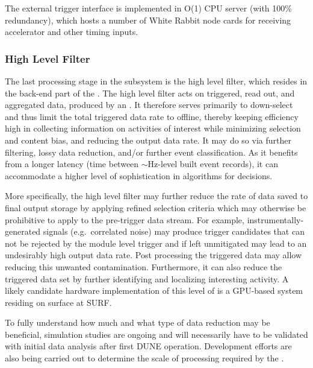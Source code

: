 The external trigger interface is implemented in O(1) CPU server (with 100\%
redundancy), which hosts a number of White Rabbit node cards for
receiving accelerator and other timing inputs.

\subsubsection{High Level Filter}
\label{sec:fd-daq:design-data-reduction}

The last processing stage in the  subsystem is the
high level filter, which resides in the back-end part of the .
The high level filter acts on triggered, read out, and aggregated data,
produced by an . 
It therefore serves primarily to down-select and thus
limit the total triggered data rate to offline, thereby keeping %
efficiency high in collecting information on activities of interest
while minimizing selection and content bias, and reducing the output data
rate. It may do so via 
further filtering, lossy data reduction, and/or further event
classification. As it benefits from a longer latency (time between
$\sim$Hz-level built event records), it can accommodate a higher level of
sophistication in algorithms for  decisions.

More specifically, the high level filter may further reduce the rate of data saved to final output storage by
applying refined selection criteria which may otherwise be prohibitive
to apply to the pre-trigger data stream.  For example, instrumentally-generated signals (e.g.~correlated noise)
may produce trigger candidates that can not be rejected by the module
level trigger and if left unmitigated may lead to an undesirably high
output data rate. 
Post processing the triggered data may allow reducing this unwanted
contamination.
Furthermore, it can also reduce the triggered data set by further identifying
and localizing interesting activity. A likely candidate hardware
implementation of this level of  is a GPU-based system
residing on surface at SURF.

To fully understand how much and what type of data reduction may be
beneficial, simulation studies are ongoing  and will
necessarily have to be
validated with initial data analysis after
first DUNE  operation. Development efforts are also being
carried out to determine the scale of 
processing required by the .


